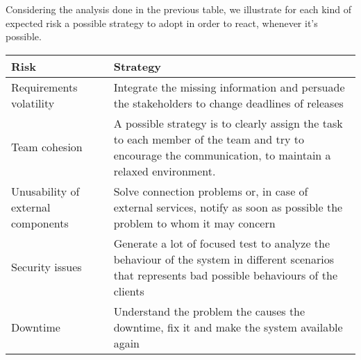 Considering the analysis done in the previous table, we illustrate for each kind of expected risk a possible strategy to adopt in order to react, whenever it’s possible.
\begin{longtable}{l|l}
\textbf{Risk}                & \textbf{Strategy}  \\ \hline
\begin{minipage}[t]{0.5\textwidth}
Requirements volatility
\end{minipage} &
\begin{minipage}[t]{0.45\textwidth}
Integrate the missing information and persuade the stakeholders to change deadlines of releases
\end{minipage} \\ \hline
\begin{minipage}[t]{0.5\textwidth}
Team cohesion
\end{minipage} &
\begin{minipage}[t]{0.45\textwidth}
A possible strategy is to clearly assign the task to each member of the team and try to encourage the communication, to maintain a relaxed environment.
\end{minipage} \\ \hline
\begin{minipage}[t]{0.5\textwidth}
Unusability of external components
\end{minipage} &
\begin{minipage}[t]{0.45\textwidth}
Solve connection problems or, in case of external services, notify as soon as possible the problem to whom it may concern
\end{minipage} \\ \hline
\begin{minipage}[t]{0.5\textwidth}
Security issues
\end{minipage} &
\begin{minipage}[t]{0.45\textwidth}
Generate a lot of focused test to analyze the behaviour of the system in different scenarios that represents bad possible behaviours of the clients
\end{minipage} \\ \hline
\begin{minipage}[t]{0.5\textwidth}
Downtime
\end{minipage} &
\begin{minipage}[t]{0.45\textwidth}
Understand the problem the causes the downtime, fix it and make the system available again
\end{minipage} \\ \hline

\end{longtable}
